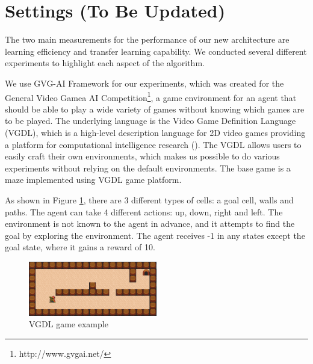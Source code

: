 
\section{Settings (To Be Updated)}
The two main measurements for the performance of our new architecture are learning efficiency and transfer learning capability.
We conducted several different experiments to highlight each aspect of the algorithm.

We use GVG-AI Framework for our experiments, which was created for the General Video Gamea AI Competition\footnote{http://www.gvgai.net/}, 
a game environment for an agent that should be able to play a wide variety of games without knowing which games are to be played.
The underlying language is the Video Game Definition Language (VGDL), which is a high-level description language for 2D video games providing a platform for computational intelligence research (\cite{Schaul2013}).
The VGDL allows users to easily craft their own environments, which makes us possible to do various experiments without relying on the default environments.
The base game is a maze implemented using VGDL game platform. 

As shown in Figure \ref{VGDL_sample}, there are 3 different types of cells: 
a goal cell, walls and paths. The agent can take 4 different actions: up, down, right and left.  
The environment is not known to the agent in advance, and it attempts to find the goal by exploring the environment.
The agent receives -1 in any states except the goal state, where it gains a reward of 10. 

\begin{figure}[!ht!b]
\centering
\includegraphics[width=0.5\textwidth]{./figures/experiment1}
\caption{VGDL game example}
\label{VGDL_sample}
\end{figure}
  

